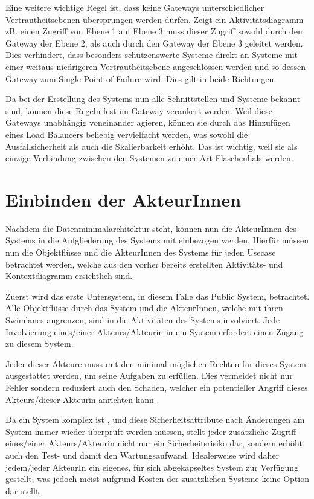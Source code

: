 Eine weitere wichtige Regel ist, dass keine Gateways unterschiedlicher Vertrautheitsebenen übersprungen werden dürfen. Zeigt ein Aktivitätsdiagramm zB. einen Zugriff von Ebene 1 auf Ebene 3 muss dieser Zugriff sowohl durch den Gateway der Ebene 2, als auch durch den Gateway der Ebene 3 geleitet werden. Dies verhindert, dass besonders schützenswerte Systeme direkt an Systeme mit einer weitaus niedrigeren Vertrautheitsebene angeschlossen werden und so dessen Gateway zum Single Point of Failure wird. Dies gilt in beide Richtungen.

Da bei der Erstellung des Systems nun alle Schnittstellen und Systeme bekannt sind, können diese Regeln fest im Gateway verankert werden. Weil diese Gateways unabhängig voneinander agieren, können sie durch das Hinzufügen eines Load Balancers beliebig vervielfacht werden, was sowohl die Ausfallsicherheit als auch die Skalierbarkeit erhöht. Das ist wichtig, weil sie als einzige Verbindung zwischen den Systemen zu einer Art Flaschenhals werden.

\section{Einbinden der AkteurInnen}
Nachdem die Datenminimalarchitektur steht, können nun die AkteurInnen des Systems in die Aufgliederung des Systems mit einbezogen werden. Hierfür müssen nun die Objektflüsse und die AkteurInnen des Systems für jeden Usecase betrachtet werden, welche aus den vorher bereits erstellten Aktivitäts- und Kontextdiagramm ersichtlich sind.

Zuerst wird das erste Untersystem, in diesem Falle das Public System, betrachtet. Alle Objektflüsse durch das System und die AkteurInnen, welche mit ihren Swimlanes angrenzen, sind in die Aktivitäten des Systems involviert. Jede Involvierung eines/einer Akteurs/Akteurin in ein System erfordert einen Zugang zu diesem System.

Jeder dieser Akteure muss mit den minimal möglichen Rechten für dieses System ausgestattet werden, um seine Aufgaben zu erfüllen. Dies vermeidet nicht nur Fehler sondern reduziert auch den Schaden, welcher ein potentieller Angriff dieses Akteurs/dieser Akteurin anrichten kann \cite[1. A]{leastpriv}.

Da ein System komplex ist \cite[S. 7]{softarch}, und diese Sicherheitsattribute nach Änderungen am System immer wieder überprüft werden müssen, stellt jeder zusätzliche Zugriff eines/einer Akteurs/Akteurin nicht nur ein Sicherheitsrisiko dar, sondern erhöht auch den Test- und damit den Wartungsaufwand. Idealerweise wird daher jedem/jeder AkteurIn ein eigenes, für sich abgekapseltes System zur Verfügung gestellt, was jedoch meist aufgrund Kosten der zusätzlichen Systeme keine Option dar stellt.

